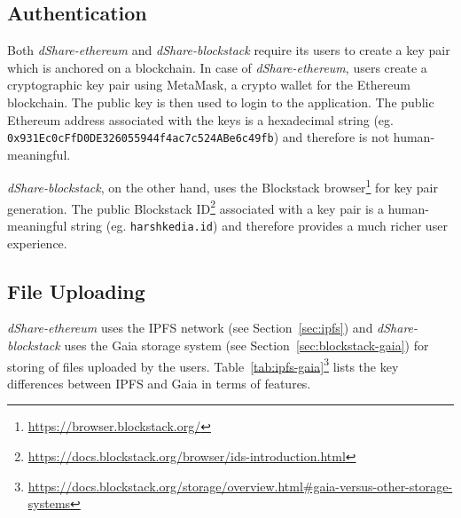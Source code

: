 		\subsection{Authentication}
		Both \textit{dShare-ethereum} and \textit{dShare-blockstack} require its users to create a key pair which is anchored on a blockchain. In case of \textit{dShare-ethereum}, users create a cryptographic key pair using MetaMask, a crypto wallet for the Ethereum blockchain. The public key is then used to login to the application. The public Ethereum address associated with the keys is a hexadecimal string (eg. \texttt{0x931Ec0cFfD0DE326055944f4ac7c524ABe6c49fb}) and therefore is not human-meaningful.
		
		\textit{dShare-blockstack}, on the other hand, uses the Blockstack browser\footnote{\url{https://browser.blockstack.org/}} for key pair generation. The public Blockstack ID\footnote{\url{https://docs.blockstack.org/browser/ids-introduction.html}} associated with a key pair is a human-meaningful string (eg. \texttt{harshkedia.id}) and therefore provides a much richer user experience.
		
		\subsection{File Uploading}
		\textit{dShare-ethereum} uses the IPFS\cite{benet2014ipfs} network (see Section~\ref{sec:ipfs}) and \textit{dShare-blockstack} uses the Gaia storage system (see Section~\ref{sec:blockstack-gaia}) for storing of files uploaded by the users. Table~\ref{tab:ipfs-gaia}\footnote{\url{https://docs.blockstack.org/storage/overview.html\#gaia-versus-other-storage-systems}} lists the key differences between IPFS and Gaia in terms of features.
		
